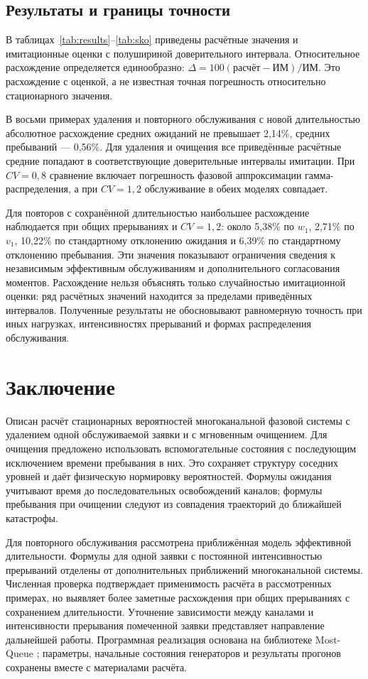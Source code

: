 \subsection{Результаты и границы точности}
В таблицах~\ref{tab:results}--\ref{tab:sko} приведены расчётные значения и имитационные оценки с полушириной доверительного интервала. Относительное расхождение определяется единообразно: \(\Delta=100(\text{расчёт}-\text{ИМ})/\text{ИМ}\). Это расхождение с оценкой, а не известная точная погрешность относительно стационарного значения.

В восьми примерах удаления и повторного обслуживания с новой длительностью абсолютное расхождение средних ожиданий не превышает 2{,}14\%, средних пребываний --- 0{,}56\%. Для удаления и очищения все приведённые расчётные средние попадают в соответствующие доверительные интервалы имитации. При \(CV=0{,}8\) сравнение включает погрешность фазовой аппроксимации гамма-распределения, а при \(CV=1{,}2\) обслуживание в обеих моделях совпадает.



Для повторов с сохранённой длительностью наибольшее расхождение наблюдается при общих прерываниях и \(CV=1{,}2\): около 5{,}38\% по \(w_1\), 2{,}71\% по \(v_1\), 10{,}22\% по стандартному отклонению ожидания и 6{,}39\% по стандартному отклонению пребывания. Эти значения показывают ограничения сведения к независимым эффективным обслуживаниям и дополнительного согласования моментов. Расхождение нельзя объяснять только случайностью имитационной оценки: ряд расчётных значений находится за пределами приведённых интервалов. Полученные результаты не обосновывают равномерную точность при иных нагрузках, интенсивностях прерываний и формах распределения обслуживания.

\FloatBarrier
\section{Заключение}
Описан расчёт стационарных вероятностей многоканальной фазовой системы с удалением одной обслуживаемой заявки и с мгновенным очищением. Для очищения предложено использовать вспомогательные состояния с последующим исключением времени пребывания в них. Это сохраняет структуру соседних уровней и даёт физическую нормировку вероятностей. Формулы ожидания учитывают время до последовательных освобождений каналов; формулы пребывания при очищении следуют из совпадения траекторий до ближайшей катастрофы.

Для повторного обслуживания рассмотрена приближённая модель эффективной длительности. Формулы для одной заявки с постоянной интенсивностью прерываний отделены от дополнительных приближений многоканальной системы. Численная проверка подтверждает применимость расчёта в рассмотренных примерах, но выявляет более заметные расхождения при общих прерываниях с сохранением длительности. Уточнение зависимости между каналами и интенсивности прерывания помеченной заявки представляет направление дальнейшей работы. Программная реализация основана на библиотеке Most-Queue \cite{mostqueue2026}; параметры, начальные состояния генераторов и результаты прогонов сохранены вместе с материалами расчёта.

\printbibliography

